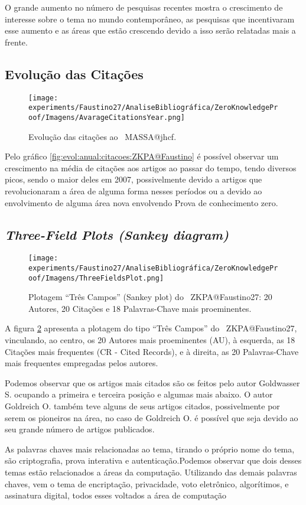 O grande aumento no número de pesquisas recentes mostra o crescimento de interesse sobre o tema no mundo contemporâneo, as pesquisas que incentivaram esse aumento e as áreas que estão crescendo devido a isso serão relatadas mais a frente.

\subsection{Evolução das Citações}

\begin{figure}
    \centering
    \texttt{[image: experiments/Faustino27/AnaliseBibliográfica/ZeroKnowledgeProof/Imagens/AvarageCitationsYear.png]}
    \caption{Evolução das citações ao \dataset\   MASSA@jhcf.}
    \label{fig:evol:anual:citacoes:ZKPA@Faustino27}
\end{figure}

Pelo gráfico \ref{fig:evol:anual:citacoes:ZKPA@Faustino} é possível observar um crescimento na média de citações aos artigos ao passar do tempo, tendo diversos picos, sendo o maior deles em 2007, possivelmente devido a artigos que revolucionaram a área de alguma forma nesses períodos ou a devido ao envolvimento de alguma área nova envolvendo Prova de conhecimento zero.

\subsection{\textit{Three-Field Plots (Sankey diagram)}}

\begin{figure}
    \centering
    \texttt{[image: experiments/Faustino27/AnaliseBibliográfica/ZeroKnowledgeProof/Imagens/ThreeFieldsPlot.png]}
    \caption{Plotagem ``Três Campos'' (Sankey plot) do \dataset\   ZKPA@Faustino27: 20 Autores, 20 Citações e 18 Palavras-Chave mais proeminentes.}
    \label{fig:ZKPA@Faustino27:ThreeFieldPlot}
\end{figure}

A figura \ref{fig:ZKPA@Faustino27:ThreeFieldPlot} apresenta a plotagem do tipo ``Três Campos'' do \dataset\  ZKPA@Faustino27, vinculando, ao centro, os 20 Autores mais proeminentes (AU), à esquerda, as 18 Citações mais frequentes (CR - Cited Records), e à direita, as 20 Palavras-Chave mais frequentes empregadas pelos autores.

Podemos observar que os artigos mais citados são os feitos pelo autor Goldwasser S. ocupando a primeira e terceira posição e algumas mais abaixo. O autor Goldreich O. também teve alguns de seus artigos citados, possivelmente por serem os pioneiros na área, no caso de Goldreich O. é possível que seja devido ao seu grande número de artigos publicados.

As palavras chaves mais relacionadas ao tema, tirando o próprio nome do tema, são criptografia, prova interativa e autenticação.Podemos observar que dois desses temas estão relacionados a áreas da computação. Utilizando das demais palavras chaves, vem o tema de encriptação, privacidade, voto eletrônico, algorítimos, e assinatura digital, todos esses voltados a área de computação